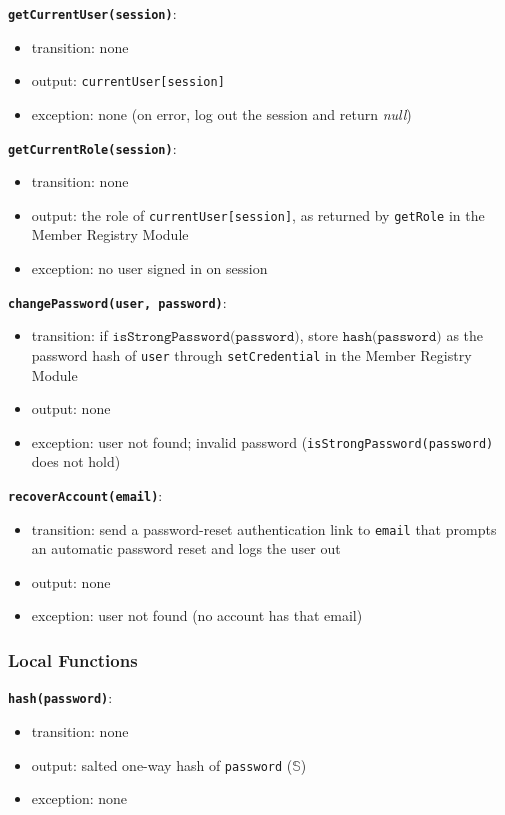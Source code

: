 \documentclass[12pt, titlepage]{article}
\begin{document}
\textbf{\texttt{getCurrentUser(session)}}:
\begin{itemize}
  \item transition: none
  \item output: \texttt{currentUser[session]}
  \item exception: none (on error, log out the session and return \textit{null})
\end{itemize}

\textbf{\texttt{getCurrentRole(session)}}:
\begin{itemize}
  \item transition: none
  \item output: the role of \texttt{currentUser[session]}, as returned by \texttt{getRole} in the Member Registry Module
  \item exception: no user signed in on session
\end{itemize}

\textbf{\texttt{changePassword(user, password)}}:
\begin{itemize}
  \item transition: if $\texttt{isStrongPassword(password)}$, store $\texttt{hash(password)}$ as the password hash of \texttt{user} through \texttt{setCredential} in the Member Registry Module
  \item output: none
  \item exception: user not found; invalid password (\texttt{isStrongPassword(password)} does not hold)
\end{itemize}

\textbf{\texttt{recoverAccount(email)}}:
\begin{itemize}
  \item transition: send a password-reset authentication link to \texttt{email} that prompts an automatic password reset and logs the user out
  \item output: none
  \item exception: user not found (no account has that email)
\end{itemize}

\subsubsection{Local Functions}

\textbf{\texttt{hash(password)}}:
\begin{itemize}
  \item transition: none
  \item output: salted one-way hash of \texttt{password} ($\mathbb{S}$)
  \item exception: none
\end{itemize}
\end{document}
